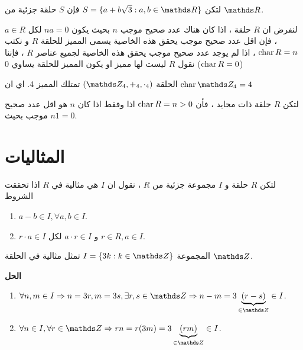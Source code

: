 \begin{example}
	لتكن $S = \{a+b\sqrt{3} : a, b\in \R \}$ فإن $S$ حلقة جزئية من $\R$.
\end{example}

\begin{definition}
	لنفرض ان $R$ حلقة ، اذا كان هناك عدد صحيح موجب $n$ بحيث يكون $na=0$ لكل $a\in R$ ، فإن اقل عدد صحيح موجب يحقق هذه الخاصية يسمى المميز للحلقة $R$ و نكتب $\operatorname{char} R = n$ ، اذا لم يوجد عدد صحيح موجب يحقق هذه الخاصية لجميع عناصر $R$ ، فإننا نقول $R$ ليست لها مميز او يكون المميز للحلقة يساوي 0 ($\operatorname{char} R=0$)
\end{definition}

\begin{example}
	الحلقة 
	$(\Z_4, +_4, \cdot_4) $ تمتلك المميز 4. اي ان $\Char \Z_4=4$
\end{example}

\begin{theorem}
	لتكن $R$ حلقة ذات محايد ، فأن $\operatorname{char} R=n >0$ اذا وفقط اذا كان $n$ هو اقل عدد صحيح موجب بحيث $n1=0$.
\end{theorem}
\newpage

\section{المثاليات}
\begin{definition}
	لتكن $R$ حلقة و $I$ مجموعة جزئية من $R$ ، نقول ان $I$ هي مثالية في $R$ اذا تحققت الشروط
		\begin{enumerate}[label=$\boxed{\arabic*}$]
			\item $a-b\in I, \forall a, b\in I$.
			\item $r\cdot a \in I$ و $a\cdot r\in I$ لكل $r\in R, a\in I$.
		\end{enumerate}
\end{definition}

\begin{example}
	المجموعة 
	$I = \{3k : k\in \Z\}$ تمثل مثالية في الحلقة $\Z$.
\end{example}
\noindent
\textbf{الحل}

\setLR
\begin{enumerate}[leftmargin=*, label=$\boxed{\arabic*}$]
	\item $\forall n,m\in I \Rightarrow n=3r, m=3s, \exists r,s\in \Z \Rightarrow n-m =3\underbrace{(r-s)}_{\in \Z} \in I$.
	\item $\forall n\in I, \forall r\in \Z \Rightarrow rn = r(3m) = 3\underbrace{(rm)}_{\in \Z} \in I$. 
\end{enumerate}

